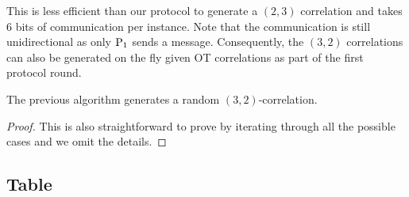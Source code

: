 This is less efficient than our protocol to generate a $(2,3)$ correlation and takes 6 bits of communication per instance. Note that the communication is still unidirectional as only $\textnormal{P}_1$ sends a message. Consequently, the $(3,2)$ correlations can also be generated on the fly given OT correlations as part of the first protocol round. 


\begin{lemma}
  The previous algorithm generates a random $(3,2)$-correlation.
\end{lemma}
\begin{proof}
This is also straightforward to prove by iterating through all the possible cases and we omit the details.
\end{proof}














\subsection{Table}



\newcommand{\formula}[1]{{\color{red} #1}}

